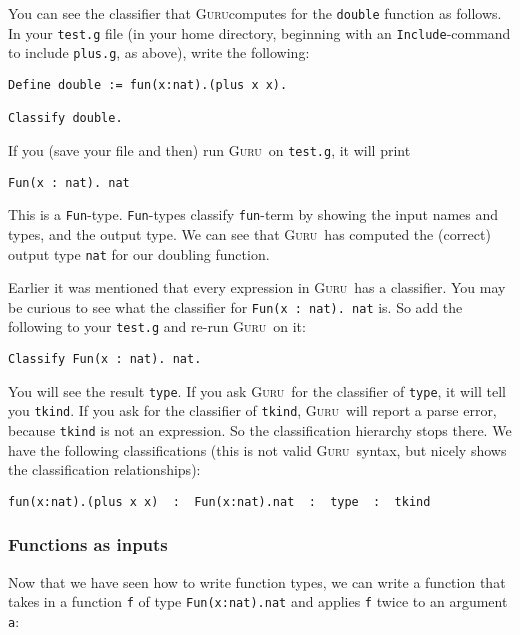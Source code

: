 \documentclass{book}[12pt]
\newcommand{\guru}[0]{\textsc{Guru}}
\begin{document}
You can see the classifier that \guru computes for the \texttt{double}
function as follows.  In your \texttt{test.g} file (in your home
directory, beginning with an \texttt{Include}-command to include
\texttt{plus.g}, as above), write the following:

\begin{verbatim}
Define double := fun(x:nat).(plus x x).

Classify double.
\end{verbatim}

\noindent If you (save your file and then) run \guru\ on \texttt{test.g},
it will print

\begin{verbatim}
Fun(x : nat). nat
\end{verbatim}

\noindent This is a \texttt{Fun}-type.  \texttt{Fun}-types classify
\texttt{fun}-term by showing the input names and types, and
the output type.  We can see that \guru\ has computed the (correct)
output type \texttt{nat} for our doubling function.

Earlier it was mentioned that every expression in \guru\ has a
classifier.  You may be curious to see what the classifier for
\texttt{Fun(x : nat). nat} is.  So add the following to your
\texttt{test.g} and re-run \guru\ on it:

\begin{verbatim}
Classify Fun(x : nat). nat.
\end{verbatim}

\noindent You will see the result \texttt{type}.  If you ask \guru\
for the classifier of \texttt{type}, it will tell you \texttt{tkind}.
If you ask for the classifier of \texttt{tkind}, \guru\ will report a
parse error, because \texttt{tkind} is not an expression.  So the
classification hierarchy stops there.  We have the following
classifications (this is not valid \guru\ syntax, but nicely shows the
classification relationships):

\begin{verbatim}
fun(x:nat).(plus x x)  :  Fun(x:nat).nat  :  type  :  tkind
\end{verbatim} 

\subsubsection{Functions as inputs}

Now that we have seen how to write function types, we can write a
function that takes in a function \texttt{f} of type
\texttt{Fun(x:nat).nat} and applies \texttt{f} twice to an argument
\texttt{a}:
\end{document}

